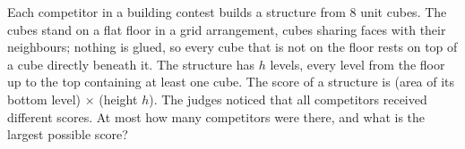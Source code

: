 Each competitor in a building contest builds a structure from $8$ unit cubes. The cubes stand on a flat floor in a grid arrangement, cubes sharing faces with their neighbours; nothing is glued, so every cube that is not on the floor rests on top of a cube directly beneath it. The structure has $h$ levels, every level from the floor up to the top containing at least one cube. The score of a structure is (area of its bottom level) $\times$ (height $h$). The judges noticed that all competitors received different scores. At most how many competitors were there, and what is the largest possible score?
